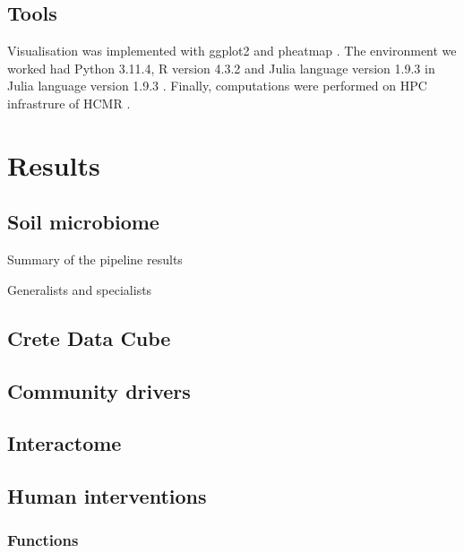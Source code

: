 \documentclass[unnumsec,webpdf,contemporary,large]{oup-authoring-template}%
\theoremstyle{thmstyleone}%
\theoremstyle{thmstyletwo}%
\theoremstyle{thmstylethree}%
\begin{document}
\subsection{Tools}\label{Coding environment}

Visualisation was implemented with ggplot2 \cite{ggplot22016} and pheatmap \cite{Kolde2019}.
The environment we worked had Python 3.11.4, R version 4.3.2 \cite{rcoreteam}
and Julia language version 1.9.3 \cite{Julia-2017}in Julia language version 1.9.3 \cite{Julia-2017}.
Finally, computations were performed on HPC infrastrure of HCMR \cite{Zafeiropoulos2021}.

\section{Results}\label{results}

\subsection{Soil microbiome}\label{soil_microbiome}

Summary of the pipeline results

Generalists and specialists


\subsection{Crete Data Cube}\label{data_cube}



\subsection{Community drivers}\label{Drivers}

\subsection{Interactome}\label{interactome}

\subsection{Human interventions}\label{Human interventions}

\subsubsection{Functions}\label{functions}
\end{document}
